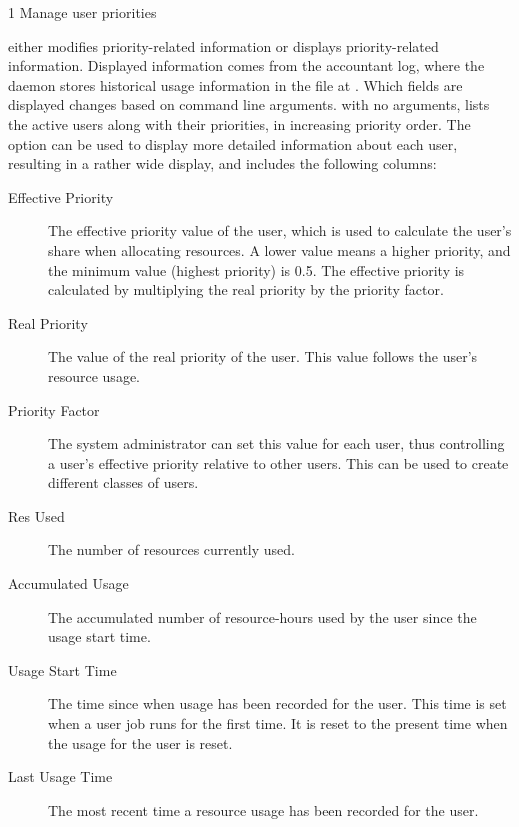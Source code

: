 \begin{ManPage}{\label{man-condor-userprio}}{1}
{Manage user priorities} 

\Synopsis {}

 \Bar{} 

\Description 
{} either modifies priority-related information
or displays priority-related information.
Displayed information comes from the accountant log,
where the  daemon stores historical usage information
in the file at .
Which fields are displayed changes based on command line arguments.
 with no arguments, 
lists the active users along with their priorities,
in increasing priority order. 
The  option can be used to display
more detailed information about each user, 
resulting in a rather wide display,
and includes the following columns:

\begin{description}
\item[Effective Priority] The effective priority value of the user, 
which is used to calculate the user's share when allocating resources. 
A lower value means a higher priority, 
and the minimum value (highest priority) is 0.5. 
The effective priority is
calculated by multiplying the real priority by the priority factor.
\item[Real Priority] The value of the real priority of the user. 
This value follows the user's resource usage.
\item[Priority Factor] The system administrator can set this value 
for each user, 
thus controlling a user's effective priority relative to other users. 
This can be used to create different classes of users.
\item[Res Used] The number of resources currently used. 
\item[Accumulated Usage] The accumulated number of resource-hours 
used by the user since the usage start time.
\item[Usage Start Time] The time since when usage has been recorded 
for the user. 
This time is set when a user job runs for the first time. 
It is reset to the present time when the
usage for the user is reset.
\item[Last Usage Time] The most recent time a resource usage has been recorded 
for the user.
\end{description}


\end{ManPage}
